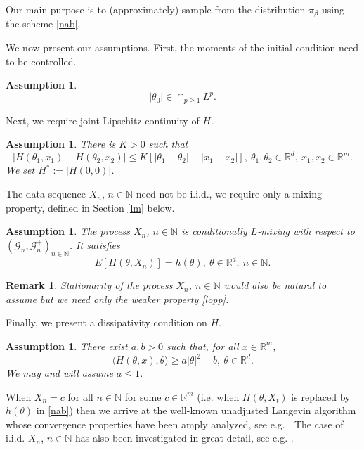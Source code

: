 \documentclass[a4paper,draft]{article}
\newtheorem{remark}[theorem]{Remark}
\newtheorem{assumption}[theorem]{Assumption}
\begin{document}
Our main purpose is to (approximately) sample from the distribution $\pi_{\beta}$ using the
scheme \eqref{nab}.

We now present our assumptions. First, the moments of the initial condition need to
be controlled.

\begin{assumption}\label{imit}
$$
|\theta_0|\in\cap_{p\geq 1} L^p.
$$
\end{assumption}

Next, we require joint Lipschitz-continuity of $H$.

\begin{assumption}\label{lip} There is $K>0$ such that
$$
|H(\theta_1,x_1)-H(\theta_2,x_2)|\leq K[|\theta_1-\theta_2|+|x_1-x_2|],\ \theta_1,\theta_2\in\mathbb{R}^d,
\ x_1,x_2\in\mathbb{R}^m.
$$
We set $H^*:=|H(0,0)|$.
\end{assumption}

The data sequence $X_n$, $n\in\mathbb{N}$ need not be i.i.d., we require
only a mixing property, defined in Section \ref{lm} below.

\begin{assumption}\label{lmiu}
The process $X_n$, $n\in\mathbb{N}$ is conditionally $L$-mixing with respect to
$(\mathcal{G}_n,\mathcal{G}^+_n)_{n\in\mathbb{N}}$. It satisfies
\begin{equation}\label{lopp}
E[H(\theta,X_n)]=h(\theta),\ \theta\in\mathbb{R}^d,\ n\in\mathbb{N}.
\end{equation}
\end{assumption}

\begin{remark}{\rm Stationarity of the process $X_n$,
$n\in\mathbb{N}$ would also be natural to assume but we need only
the weaker property \eqref{lopp}.}
\end{remark}

Finally, we present a dissipativity condition on $H$.

\begin{assumption}\label{dissipativity}
There exist $a,b>0$ such that, for all $x\in\mathbb{R}^m$,
\begin{equation}\label{principal}
\langle H(\theta,x),\theta\rangle\geq a |\theta|^2-b,\ \theta\in\mathbb{R}^d.
\end{equation}
We may and will assume $a\leq 1$.
\end{assumption}

When $X_n=c$ for all $n\in\mathbb{N}$ for some $c\in\mathbb{R}^m$
(i.e. when $H(\theta,X_t)$ is replaced by $h(\theta)$
in \eqref{nab}) then we arrive at the well-known unadjusted Langevin algorithm
whose convergence properties have been amply analyzed, see e.g.
\cite{dalalyan,unadjusted,berkeley,alex}. The case of i.i.d.
$X_n$, $n\in\mathbb{N}$ has also been
investigated in great detail, see e.g. \cite{raginsky,xu,alex}.
\end{document}
